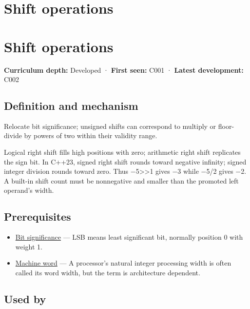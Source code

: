 \hypertarget{appendix-73425b25118e}{}
\section*{Shift operations}
\section{Shift operations}\label{shift-operations}

\textbf{Curriculum depth:} Developed · \textbf{First seen:} C001 · \textbf{Latest development:} C002

\subsection{Definition and mechanism}\label{definition-and-mechanism}

Relocate bit significance; unsigned shifts can correspond to multiply or floor-divide by powers of two within their validity range.

Logical right shift fills high positions with zero; arithmetic right shift replicates the sign bit. In C++23, signed right shift rounds toward negative infinity; signed integer division rounds toward zero. Thus −5\textgreater\textgreater1 gives −3 while −5/2 gives −2. A built-in shift count must be nonnegative and smaller than the promoted left operand's width.

\subsection{Prerequisites}\label{prerequisites}

\begin{itemize}
\tightlist
\item
  \hyperref[appendix-280445746493]{Bit significance} --- LSB means least significant bit, normally position 0 with weight 1.
\item
  \hyperref[appendix-d67a19507dc5]{Machine word} --- A processor's natural integer processing width is often called its word width, but the term is architecture dependent.
\end{itemize}

\subsection{Used by}\label{used-by}


